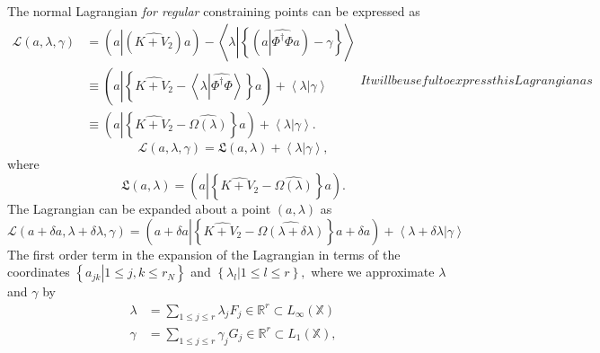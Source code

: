 \documentclass[aps,preprint]{revtex4}%
\begin{document}
The normal Lagrangian \emph{for regular} constraining points can be expressed
as
\begin{subequations}
\begin{align}
\mathcal{L}\left(  a,\lambda,\gamma\right)   &  =\left(  a\left\vert \left(
\widehat{K+V_{2}}\right)  \right.  a\right)  -\left\langle \lambda\left\vert
\left\{  \left(  a\left\vert \widehat{\Phi^{\dagger}\Phi}\right.  a\right)
-\gamma\right\}  \right.  \right\rangle \nonumber\\
&  \equiv\left(  a\left\vert \left\{  \widehat{K+V_{2}}-\left\langle
\lambda\left\vert \widehat{\Phi^{\dagger}\Phi}\right.  \right\rangle \right\}
\right.  a\right)  +\left\langle \lambda\left\vert \overset{}{\gamma}\right.
\right\rangle \nonumber\\
&  \equiv\left(  a\left\vert \left\{  \widehat{K+V_{2}}-\widehat{\Omega\left(
\lambda\right)  }\right\}  \right.  a\right)  +\left\langle \lambda\left\vert
\overset{}{\gamma}\right.  \right\rangle .
\end{align}
It will be useful to express this Lagrangian as
\end{subequations}
\begin{equation}
\mathcal{L}\left(  a,\lambda,\gamma\right)  =\mathfrak{L}\left(
a,\lambda\right)  +\left\langle \lambda\left\vert \overset{}{\gamma}\right.
\right\rangle ,
\end{equation}
where
\begin{equation}
\mathfrak{L}\left(  a,\lambda\right)  =\left(  a\left\vert \left\{
\widehat{K+V_{2}}-\widehat{\Omega\left(  \lambda\right)  }\right\}  \right.
a\right)  .
\end{equation}
The Lagrangian can be expanded about a point $\left(  a,\lambda\right)  $ as
\begin{equation}
\mathcal{L}\left(  a+\delta a,\lambda+\delta\lambda,\gamma\right)  =\left(
a+\delta a\left\vert \left\{  \widehat{K+V_{2}}-\widehat{\Omega\left(
\lambda+\delta\lambda\right)  }\right\}  \right.  a+\delta a\right)
+\left\langle \lambda+\delta\lambda\left\vert \overset{}{\gamma}\right.
\right\rangle
\end{equation}
The first order term in the expansion of the Lagrangian in terms of the
coordinates $\left\{  \left.  a_{jk}\right\vert 1\leq j,k\leq r_{N}\right\}  $
and $\left\{  \left.  \lambda_{l}\right\vert 1\leq l\leq r\right\}  ,$ where
we approximate $\lambda$ and $\gamma$ by
\begin{align}
\lambda &  =\sum_{1\leq j\leq r}\lambda_{j}F_{j}\in\mathbb{R}^{r}\subset
L_{\infty}\left(  \mathbb{X}\right)  \nonumber\\
\gamma &  =\sum_{1\leq j\leq r}\gamma_{j}G_{j}\in\mathbb{R}^{r}\subset
L_{1}\left(  \mathbb{X}\right)  ,
\end{align}
\end{document}
